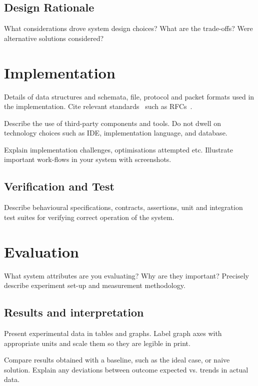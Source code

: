 \section{Design Rationale}

What considerations drove system design choices? What are the trade-offs? Were alternative solutions considered?


\chapter{Implementation}

Details of data structures and schemata, file, protocol and packet formats used in the implementation. Cite relevant standards~\autocite{standard} such as RFCs~\autocite{electronhowinfo}. 

Describe the use of third-party components and tools. Do not dwell on technology choices such as IDE, implementation language, and database.

Explain implementation challenges, optimisations attempted etc. Illustrate important work-flows in your system with screenshots.

\section{Verification and Test}

Describe behavioural specifications, contracts, assertions, unit and integration test suites for verifying correct operation of the system. 


\chapter{Evaluation}

What system attributes are you evaluating? Why are they important? Precisely describe experiment set-up and measurement methodology.

\section{Results and interpretation}

Present experimental data in tables and graphs. Label graph axes with appropriate units and scale them so they are legible in print.

Compare results obtained with a baseline, such as the ideal case, or naive solution. Explain any deviations between outcome expected vs. trends in actual data. 



